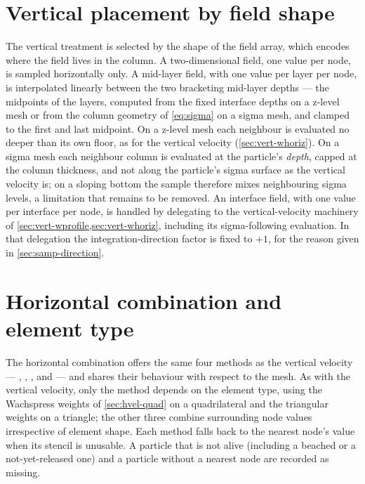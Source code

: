 \section{Vertical placement by field shape}\label{sec:samp-shape}

The vertical treatment is selected by the shape of the field array, which encodes
where the field lives in the column. A two-dimensional field, one value per node, is
sampled horizontally only. A mid-layer field, with one value per layer per node, is
interpolated linearly between the two bracketing mid-layer depths --- the midpoints of
the layers, computed from the fixed interface depths on a z-level mesh or from the
column geometry of \cref{eq:sigma} on a sigma mesh, and clamped to the first and last midpoint. On a
z-level mesh each neighbour is evaluated no deeper than its own floor, as for the vertical velocity
(\cref{sec:vert-whoriz}). On a sigma mesh each neighbour column is evaluated at the particle's
\emph{depth}, capped at the column thickness, and not along the particle's sigma surface as the
vertical velocity is; on a sloping bottom the sample therefore mixes neighbouring sigma levels, a
limitation that remains to be removed. An interface field, with one value per interface per node, is
handled by delegating to the vertical-velocity machinery of \cref{sec:vert-wprofile,sec:vert-whoriz},
including its sigma-following evaluation. In that delegation the integration-direction
factor is fixed to $+1$, for the reason given in \cref{sec:samp-direction}.

\section{Horizontal combination and element type}\label{sec:samp-horiz}

The horizontal combination offers the same four methods as the vertical velocity ---
, , , and  --- and shares their
behaviour with respect to the mesh. As with the vertical velocity, only the
 method depends on the element type, using the Wachspress weights of
\cref{sec:hvel-quad} on a quadrilateral and the triangular weights on a triangle; the
other three combine surrounding node values irrespective of element shape. Each method
falls back to the nearest node's value when its stencil is unusable. A particle that is not alive
(including a beached or a not-yet-released one) and a particle without a nearest node are recorded as
missing.

